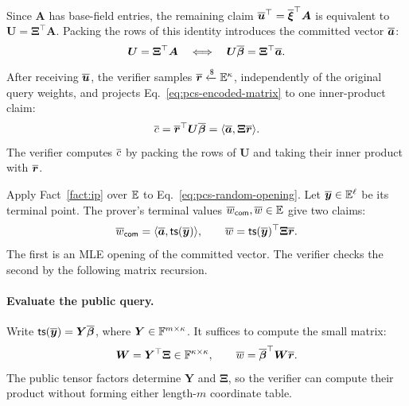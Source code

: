 Since \(\bm A\) has base-field entries, the remaining claim
\(\overline{\bm u}^{\top}=\overline{\bm\xi}^{\top}\bm A\) is equivalent
to \(\bm U=\bm\Xi^\top\bm A\). Packing the rows of this
identity introduces the committed vector \(\overline{\bm a}\):
\begin{equation}
    \bm U=\bm\Xi^\top\bm A
    \quad\Longleftrightarrow\quad
    \bm U\overline{\bm\beta}
    =\bm\Xi^\top\overline{\bm a}.
\label{eq:pcs-encoded-matrix}
\end{equation}
After receiving \(\overline{\bm u}\), the verifier samples
\(\overline{\bm r}\mathrel{\xleftarrow{\$}}\mathbb{E}^\kappa\), independently of
the original query weights, and projects
Eq.~\eqref{eq:pcs-encoded-matrix} to one inner-product claim:
\begin{equation}
    \overline{c}
    =\overline{\bm r}^{\top}\bm U\overline{\bm\beta}
    =\langle\overline{\bm a},\bm\Xi\overline{\bm r}\rangle.
\label{eq:pcs-random-opening}
\end{equation}
The verifier computes \(\overline{c}\) by packing the rows of
\(\bm U\) and taking their inner product with \(\overline{\bm r}\).

Apply Fact~\ref{fact:ip} over \(\mathbb{E}\) to
Eq.~\eqref{eq:pcs-random-opening}.
Let \(\overline{\bm y}\in\mathbb{E}^\ell\) be its terminal point.
The prover's terminal values
\(\overline{w}_{\mathsf{com}},\overline{w}\in\mathbb{E}\) give two claims:
\begin{equation}
    \overline{w}_{\mathsf{com}}
    =\langle\overline{\bm a},{\sf ts}(\overline{\bm y})\rangle,
    \qquad
    \overline{w}={\sf ts}(\overline{\bm y})^{\top}\bm\Xi\overline{\bm r}.
\label{eq:pcs-terminal-claims}
\end{equation}
The first is an MLE opening of the committed vector.
The verifier checks the second by the following matrix recursion.

\paragraph{Evaluate the public query.}
Write \({\sf ts}(\overline{\bm y})=\bm Y\overline{\bm\beta}\), where
\(\bm Y\in{\mathbb{F}}^{m\times\kappa}\).
It suffices to compute the small matrix:
\begin{equation}
    \bm W=\bm Y^\top\bm\Xi\in{\mathbb{F}}^{\kappa\times\kappa},
    \qquad
    \overline{w}=\overline{\bm\beta}^{\top}\bm W\overline{\bm r}.
\label{eq:pcs-query-matrix}
\end{equation}
The public tensor factors determine \(\bm Y\) and \(\bm\Xi\),
so the verifier can compute their product without forming either
length-\(m\) coordinate table.

